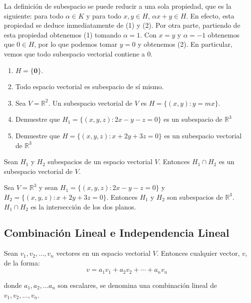 La definici\'on de subespacio se puede reducir a una sola propiedad, que es la siguiente: para todo $\alpha \in K$ y para todo $x, y \in H$, $\alpha x+y \in H$. En efecto, esta propiedad se deduce inmediatamente de (1) y (2). Por otra parte, partiendo de esta propiedad
obtenemos (1) tomando $\alpha = 1$. Con $x = y$ y $\alpha = -1$ obtenemos que $0\in H $, por
lo que podemos tomar $y = 0$ y obtenemos (2). En particular, vemos que todo
subespacio vectorial contiene a $0$.




\begin{ejem}
\begin{enumerate}
\item
$H = \{ \textbf{0} \}$.

\item
Todo espacio vectorial es subespacio de sí mismo.


\item
Sea $V = \mathbb{R}^2$. Un subespacio vectorial de $V$ es $H = \{ (x,y): y = mx \}$.


\item
Demuestre que $H_1 = \{(x,y,z): 2x - y - z = 0 \}$ es un subespacio de $\mathbb{R}^3$
\item Demuestre que $H = \{ (x,y,z): x + 2y + 3z = 0 \}$ es un subespacio vectorial de $\mathbb{R}^3$
\end{enumerate}
\end{ejem}



\begin{thm}
Sean $H_1$ y $H_2$ subespacios de un espacio vectorial $V$. Entonces $H_1 \cap H_2$ es un subespacio vectorial de $V$.
\end{thm}

\begin{ejem}
Sea $V = \mathbb{R}^3$ y sean $H_1 = \{(x,y,z): 2x - y - z = 0 \}$ y $H_2 = \{ (x,y,z): x + 2y + 3z = 0 \}$. Entonces $H_1$ y $H_2$ son subespacios de $\mathbb{R}^3$. $H_1 \cap H_2$ es la intersecci\'on de los dos planos.
\end{ejem}


\subsection{Combinación Lineal e Independencia Lineal}

\begin{defin}
Sean $v_1, v_2, \dots, v_n$ vectores en un espacio vectorial $V$. Entonces cualquier vector, $v$, de la forma: 
$$v = a_1 v_1 + a_2v_2 + \cdots +a_n v_n$$ 

donde $a_1, a_2, \dots a_n$ son escalares, se denomina una combinación lineal de $v_1, v_2, \dots , v_n$.
\end{defin}


